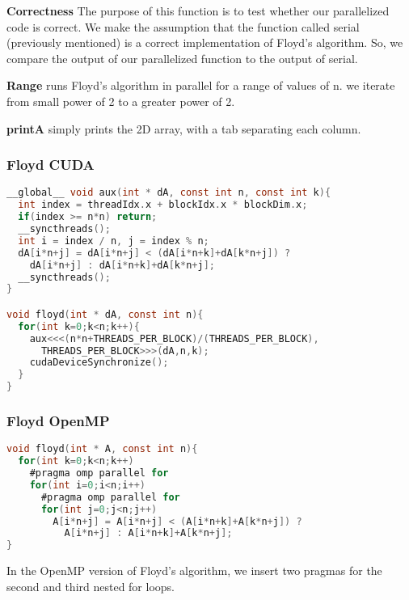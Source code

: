 \documentclass[12pt]{article}
\begin{document}
\textbf{Correctness}
The purpose of this function is to test whether our parallelized code 
is correct. We make the assumption that the function called serial (previously mentioned) 
is a correct implementation of Floyd's algorithm. So, we compare the 
output of our parallelized function to the output of serial. 

\textbf{Range} runs Floyd's algorithm in parallel for a range of values
of n. we iterate from small power of 2 to a greater power of 2. 

\textbf{printA} simply prints the 2D array, with a tab separating each column.

\newpage
\subsubsection*{Floyd CUDA}
\begin{lstlisting}[frame=single,language=C,caption=Floyd CUDA \label{code:make}]
__global__ void aux(int * dA, const int n, const int k){
  int index = threadIdx.x + blockIdx.x * blockDim.x;
  if(index >= n*n) return;
  __syncthreads();
  int i = index / n, j = index % n;
  dA[i*n+j] = dA[i*n+j] < (dA[i*n+k]+dA[k*n+j]) ? 
    dA[i*n+j] : dA[i*n+k]+dA[k*n+j];
  __syncthreads();
}

void floyd(int * dA, const int n){
  for(int k=0;k<n;k++){
    aux<<<(n*n+THREADS_PER_BLOCK)/(THREADS_PER_BLOCK),
      THREADS_PER_BLOCK>>>(dA,n,k);
    cudaDeviceSynchronize();
  }
}
\end{lstlisting}
\subsubsection*{Floyd OpenMP}
\begin{lstlisting}[frame=single,language=C,caption=Floyd OpenMP \label{code:make}]
void floyd(int * A, const int n){
  for(int k=0;k<n;k++)
    #pragma omp parallel for
    for(int i=0;i<n;i++)
      #pragma omp parallel for
      for(int j=0;j<n;j++)
        A[i*n+j] = A[i*n+j] < (A[i*n+k]+A[k*n+j]) ? 
          A[i*n+j] : A[i*n+k]+A[k*n+j];
}
\end{lstlisting}
In the OpenMP version of Floyd's algorithm, we insert two pragmas for the second and
third nested for loops.

\newpage
\end{document}
